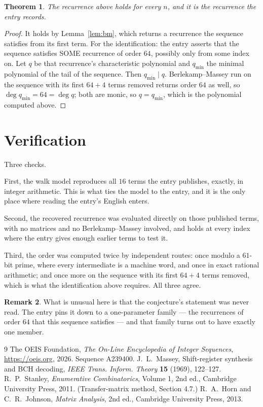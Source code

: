 \documentclass[11pt,a4paper]{article}
\theoremstyle{plain}
\newtheorem{theorem}{Theorem}
\theoremstyle{definition}
\newtheorem{remark}[theorem]{Remark}
\begin{document}
\begin{theorem}
The recurrence above holds for every $n$, and it is the recurrence the entry records.
\end{theorem}

\begin{proof}
It holds by Lemma~\ref{lem:bm}, which returns a recurrence the sequence satisfies from its
first term. For the identification: the entry asserts that the sequence satisfies SOME
recurrence of order $64$, possibly only from some index on. Let $q$ be that recurrence's
characteristic polynomial and $q_{\min}$ the minimal polynomial of the tail of the sequence.
Then $q_{\min}\mid q$. Berlekamp--Massey run on the sequence with its first $64+4$ terms
removed returns order $64$ as well, so $\deg q_{\min}=64=\deg q$; both are monic, so
$q=q_{\min}$, which is the polynomial computed above.
\end{proof}

\section{Verification}

Three checks.

First, the walk model reproduces all $16$ terms the entry publishes, exactly, in integer
arithmetic. This is what ties the model to the entry, and it is the only place where reading
the entry's English enters.

Second, the recovered recurrence was evaluated directly on those published terms, with no
matrices and no Berlekamp--Massey involved, and holds at every index where the entry gives
enough earlier terms to test it.

Third, the order was computed twice by independent routes: once modulo a $61$-bit prime, where
every intermediate is a machine word, and once in exact rational arithmetic; and once more on
the sequence with its first $64+4$ terms removed, which is what the identification above
requires. All three agree.

\begin{remark}
What is unusual here is that the conjecture's statement was never read. The entry pins it down
to a one-parameter family --- the recurrences of order $64$ that this sequence satisfies
--- and that family turns out to have exactly one member.
\end{remark}

\begin{thebibliography}{9}
 The OEIS Foundation, \emph{The On-Line Encyclopedia of Integer
Sequences}, \url{https://oeis.org}, 2026. Sequence A239400.
 J.~L.~Massey, Shift-register synthesis and BCH decoding, \emph{IEEE
Trans. Inform. Theory} \textbf{15} (1969), 122--127.
 R.~P.~Stanley, \emph{Enumerative Combinatorics}, Volume 1, 2nd ed.,
Cambridge University Press, 2011. (Transfer-matrix method, Section 4.7.)
 R.~A.~Horn and C.~R.~Johnson, \emph{Matrix Analysis}, 2nd ed., Cambridge
University Press, 2013.
\end{thebibliography}
\end{document}
